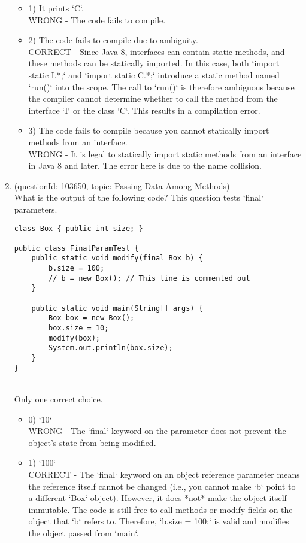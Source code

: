 \documentclass[12pt]{article}
\begin{document}
\begin{enumerate}[label=(\arabic*)]
\begin{itemize}
\item 1) It prints `C`.
 \\ 
WRONG - The code fails to compile.

\item 2) The code fails to compile due to ambiguity.
 \\ 
CORRECT - Since Java 8, interfaces can contain static methods, and these methods can be statically imported. In this case, both `import static I.*;` and `import static C.*;` introduce a static method named `run()` into the scope. The call to `run()` is therefore ambiguous because the compiler cannot determine whether to call the method from the interface `I` or the class `C`. This results in a compilation error.

\item 3) The code fails to compile because you cannot statically import methods from an interface.
 \\ 
WRONG - It is legal to statically import static methods from an interface in Java 8 and later. The error here is due to the name collision.

\end{itemize}
\item (questionId: 103650, topic: Passing Data Among Methods) \\ 
What is the output of the following code? This question tests `final` parameters.
\begin{verbatim}
class Box { public int size; }

public class FinalParamTest {
    public static void modify(final Box b) {
        b.size = 100;
        // b = new Box(); // This line is commented out
    }

    public static void main(String[] args) {
        Box box = new Box();
        box.size = 10;
        modify(box);
        System.out.println(box.size);
    }
}
\end{verbatim}
\\ \noindent Only one correct choice. 
\begin{itemize}
\item 0) `10`
 \\ 
WRONG - The `final` keyword on the parameter does not prevent the object's state from being modified.

\item 1) `100`
 \\ 
CORRECT - The `final` keyword on an object reference parameter means the reference itself cannot be changed (i.e., you cannot make `b` point to a different `Box` object). However, it does *not* make the object itself immutable. The code is still free to call methods or modify fields on the object that `b` refers to. Therefore, `b.size = 100;` is valid and modifies the object passed from `main`.


\end{itemize}
\end{enumerate}
\end{document}
